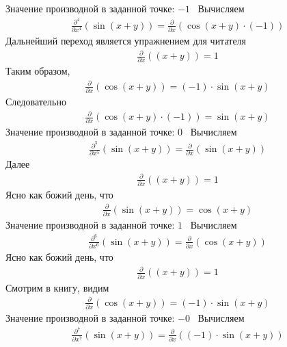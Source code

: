 \documentclass{article}
\begin{document}
Значение производной в заданной точке: $-1$ \ 
Вычисляем
\begin{gather}
\frac{\partial ^{4}}{\partial {x}^{4}}\left(\sin{ \left(x + y\right) }\right)=\frac{\partial }{\partial x}\left(\cos{ \left(x + y\right) } \cdot (-1)\right)
\end{gather}
Дальнейший переход является упражнением для читателя
\begin{gather}
\frac{\partial }{\partial x}\left(\left(x + y\right)\right)=1
\end{gather}
Таким образом,
\begin{gather}
\frac{\partial }{\partial x}\left(\cos{ \left(x + y\right) }\right)=(-1) \cdot \sin{ \left(x + y\right) }
\end{gather}
Следовательно
\begin{gather}
\frac{\partial }{\partial x}\left(\cos{ \left(x + y\right) } \cdot (-1)\right)=\sin{ \left(x + y\right) }
\end{gather}
Значение производной в заданной точке: $0$ \ 
Вычисляем
\begin{gather}
\frac{\partial ^{5}}{\partial {x}^{5}}\left(\sin{ \left(x + y\right) }\right)=\frac{\partial }{\partial x}\left(\sin{ \left(x + y\right) }\right)
\end{gather}
Далее
\begin{gather}
\frac{\partial }{\partial x}\left(\left(x + y\right)\right)=1
\end{gather}
Ясно как божий день, что
\begin{gather}
\frac{\partial }{\partial x}\left(\sin{ \left(x + y\right) }\right)=\cos{ \left(x + y\right) }
\end{gather}
Значение производной в заданной точке: $1$ \ 
Вычисляем
\begin{gather}
\frac{\partial ^{6}}{\partial {x}^{6}}\left(\sin{ \left(x + y\right) }\right)=\frac{\partial }{\partial x}\left(\cos{ \left(x + y\right) }\right)
\end{gather}
Ясно как божий день, что
\begin{gather}
\frac{\partial }{\partial x}\left(\left(x + y\right)\right)=1
\end{gather}
Смотрим в книгу, видим
\begin{gather}
\frac{\partial }{\partial x}\left(\cos{ \left(x + y\right) }\right)=(-1) \cdot \sin{ \left(x + y\right) }
\end{gather}
Значение производной в заданной точке: $-0$ \ 
Вычисляем
\begin{gather}
\frac{\partial ^{7}}{\partial {x}^{7}}\left(\sin{ \left(x + y\right) }\right)=\frac{\partial }{\partial x}\left((-1) \cdot \sin{ \left(x + y\right) }\right)
\end{gather}
\end{document}
